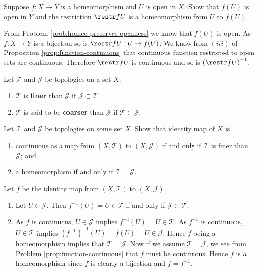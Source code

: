 \begin{problem}
	Suppose $f: X \to Y$ is a homeomorphism and $U$ is open in $X$.
	Show that $f(U)$ is open in $Y$ 
	and the restriction $\restr fU$ is a homeomorphism from $U$ to $f(U)$.
\end{problem}

\begin{solution}
	From Problem \ref{prob:homeo-preserves-openness} we know that $f(U)$ is open.
	As $f: X \to Y$ is a bijection so is $\restr fU: U \to f(U)$.
	We know from $(iii)$ of Proposition \ref{prop:function-continuous} that
	continuous function restricted to open sets are continuous.
	Therefore $\restr fU$ is continuous and so is $\left(\restr fU\right)^{-1}$.
\end{solution}

\begin{definition}
	Let $\mathcal T$ and $\mathcal J$ be topologies on a set $X$. 
	\begin{enumerate}
		\item $\mathcal T$ is \textbf{finer} than $\mathcal J$ 
			if $\mathcal J \subset \mathcal T$.

		\item $\mathcal T$ is said to be \textbf{coarser} than $\mathcal J$
			if $\mathcal T \subset \mathcal J$.
	\end{enumerate}
\end{definition}

\begin{problem}
	Let $\mathcal T$ and $\mathcal J$ be topologies on some set $X$.
	Show that identity map of $X$ is 
	\begin{enumerate}
		\item continuous as a map from $(X, \mathcal T)$ to $(X, \mathcal J)$ if 
			and only if $\mathcal T$ is finer than $\mathcal J$; and
		\item a homeomorphism if and only if $\mathcal T = \mathcal J$.
	\end{enumerate}
\end{problem}

\begin{solution}
	Let $f$ be the identity map from $(X, \mathcal T)$ to $(X, \mathcal J)$.
	\begin{enumerate}
		\item
			Let $U \in \mathcal J$. 
			Then $f^{-1}(U) = U \in \mathcal T$ if and only if 
			$\mathcal J \subset \mathcal T$.
			
		\item 
			As $f$ is continuous, $U \in \mathcal J$ implies
			$f^{-1}(U) = U \in \mathcal T$.	
			As $f^{-1}$ is continuous, $U \in \mathcal T$ implies
			$\left(f^{-1}\right)^{-1}(U) = f(U) = U \in \mathcal J$.
			Hence $f$ being a homeomorphism implies that 
			$\mathcal T = \mathcal J$.
			Now if we assume $\mathcal T = \mathcal J$, we see from Problem
			\ref{prop:function-continuous} that $f$ must be continuous.
			Hence $f$ is a homeomorphism since $f$ is clearly a bijection and
			$f = f^{-1}$.
	\end{enumerate}
\end{solution}

